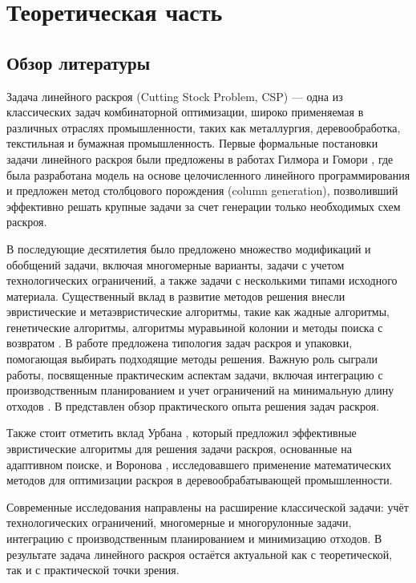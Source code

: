 \chapter{Теоретическая часть}\label{ch:theor_ch}

\section{Обзор литературы}\label{sec:theor_ch/literature_review}

Задача линейного раскроя (Cutting Stock Problem, CSP) — одна из классических задач комбинаторной оптимизации, широко применяемая в различных отраслях промышленности, таких как металлургия, деревообработка, текстильная и бумажная промышленность. Первые формальные постановки задачи линейного раскроя были предложены в работах Гилмора и Гомори \cite{gilmore1961linear, gilmore1963linear}, где была разработана модель на основе целочисленного линейного программирования и предложен метод столбцового порождения (column generation), позволивший эффективно решать крупные задачи за счет генерации только необходимых схем раскроя.

В последующие десятилетия было предложено множество модификаций и обобщений задачи, включая многомерные варианты, задачи с учетом технологических ограничений, а также задачи с несколькими типами исходного материала. Существенный вклад в развитие методов решения внесли эвристические и метаэвристические алгоритмы, такие как жадные алгоритмы, генетические алгоритмы, алгоритмы муравьиной колонии и методы поиска с возвратом \cite{vanderbeck2000integer, dyckhoff1990typology}. В работе \cite{dyckhoff1990typology} предложена типология задач раскроя и упаковки, помогающая выбирать подходящие методы решения. Важную роль сыграли работы, посвященные практическим аспектам задачи, включая интеграцию с производственным планированием и учет ограничений на минимальную длину отходов \cite{delorme2016bin, scheithauer1999practical}. В \cite{scheithauer1999practical} представлен обзор практического опыта решения задач раскроя.

Также стоит отметить вклад Урбана \cite{urban1999solving}, который предложил эффективные эвристические алгоритмы для решения задачи раскроя, основанные на адаптивном поиске, и Воронова \cite{voronov2005application}, исследовавшего применение математических методов для оптимизации раскроя в деревообрабатывающей промышленности.

Современные исследования направлены на расширение классической задачи: учёт технологических ограничений, многомерные и многорулонные задачи, интеграцию с производственным планированием и минимизацию отходов. В результате задача линейного раскроя остаётся актуальной как с теоретической, так и с практической точки зрения.

\FloatBarrier

